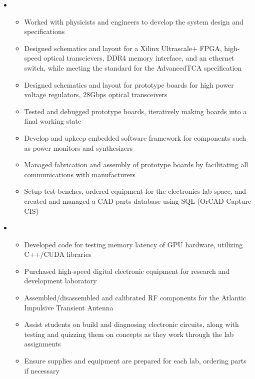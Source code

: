 \documentclass[10pt,a4paper,sans]{moderncv}        %
\begin{document}
\begin{itemize}

\item{
\begin{itemize}
\item Worked with physicists and engineers to develop the system design and specifications
\item Designed schematics and layout for a Xilinx Ultrascale+ FPGA, high-speed optical transcievers, DDR4 memory interface, and an ethernet switch, while meeting the standard for the AdvancedTCA specification
\item Designed schematics and layout for prototype boards for high power voltage regulators, 28Gbps optical transceivers
\item Tested and debugged prototype boards, iteratively making boards into a final working state
\item Develop and upkeep embedded software framework for components such as power monitors and synthesizers
\item Managed fabrication and assembly of prototype boards by facilitating all communications with manufacturers
\item Setup test-benches, ordered equipment for the electronics lab space, and created and managed a CAD parts database using SQL (OrCAD Capture CIS)
\end{itemize}
}

\vspace{6pt}

\item{
\begin{itemize}
\item Developed code for testing memory latency of GPU hardware, utilizing C++/CUDA libraries
\item Purchased high-speed digital electronic equipment for research and development laboratory
\item Assembled/disassembled and calibrated RF components for the Atlantic Impulsive Transient Antenna
\item Assist students on build and diagnosing electronic circuits, along with testing and quizzing them on concepts as they work through the lab assignments
\item Ensure supplies and equipment are prepared for each lab, ordering parts if necessary
\end{itemize}
}

\vspace{6pt}


\end{itemize}
\end{document}
